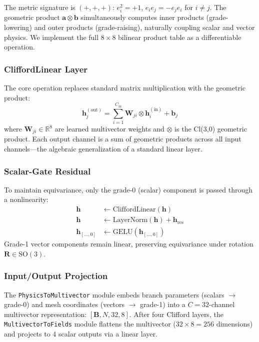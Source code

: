 \documentclass[conference]{IEEEtran}
\begin{document}
The metric signature is $(+,+,+)$: $e_i^2 = +1$, $e_i e_j = -e_j e_i$ for $i \neq j$. The geometric product $\bm{a} \otimes \bm{b}$ simultaneously computes inner products (grade-lowering) and outer products (grade-raising), naturally coupling scalar and vector physics. We implement the full $8 \times 8$ bilinear product table as a differentiable operation.

\subsubsection{CliffordLinear Layer}
The core operation replaces standard matrix multiplication with the geometric product:
\begin{equation}
\bm{h}_j^{(\text{out})} = \sum_{i=1}^{C_\text{in}} \bm{W}_{ji} \otimes \bm{h}_i^{(\text{in})} + \bm{b}_j
\label{eq:clifford_linear}
\end{equation}
where $\bm{W}_{ji} \in \mathbb{R}^8$ are learned multivector weights and $\otimes$ is the Cl(3,0) geometric product. Each output channel is a sum of geometric products across all input channels---the algebraic generalization of a standard linear layer.

\subsubsection{Scalar-Gate Residual}
To maintain equivariance, only the grade-0 (scalar) component is passed through a nonlinearity:
\begin{align}
\bm{h} &\leftarrow \text{CliffordLinear}(\bm{h}) \\
\bm{h} &\leftarrow \text{LayerNorm}(\bm{h}) + \bm{h}_\text{res} \\
\bm{h}_{[\ldots, 0]} &\leftarrow \text{GELU}(\bm{h}_{[\ldots, 0]}) \label{eq:scalar_gate}
\end{align}
Grade-1 vector components remain linear, preserving equivariance under rotation $\bm{R} \in \text{SO}(3)$.

\subsubsection{Input/Output Projection}
The \texttt{PhysicsToMultivector} module embeds branch parameters (scalars $\to$ grade-0) and mesh coordinates (vectors $\to$ grade-1) into a $C = 32$-channel multivector representation: $[\bm{B}, N, 32, 8]$. After four Clifford layers, the \texttt{MultivectorToFields} module flattens the multivector ($32 \times 8 = 256$ dimensions) and projects to 4 scalar outputs via a linear layer.
\end{document}
